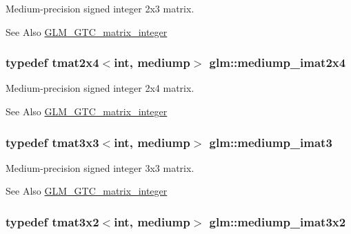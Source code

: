 Medium-\/precision signed integer 2x3 matrix. \begin{DoxySeeAlso}{See Also}
\hyperlink{group__gtc__matrix__integer}{G\-L\-M\-\_\-\-G\-T\-C\-\_\-matrix\-\_\-integer} 
\end{DoxySeeAlso}
\hypertarget{group__gtc__matrix__integer_ga944a139f15de6bc12e9c7bf615ffc4f5}{
\subsubsection[{mediump\-\_\-imat2x4}]{\setlength{\rightskip}{0pt plus 5cm}typedef tmat2x4$<$int, mediump$>$ {\bf glm\-::mediump\-\_\-imat2x4}}}\label{group__gtc__matrix__integer_ga944a139f15de6bc12e9c7bf615ffc4f5}
Medium-\/precision signed integer 2x4 matrix. \begin{DoxySeeAlso}{See Also}
\hyperlink{group__gtc__matrix__integer}{G\-L\-M\-\_\-\-G\-T\-C\-\_\-matrix\-\_\-integer} 
\end{DoxySeeAlso}
\hypertarget{group__gtc__matrix__integer_gab033bd6a2bfebb1aa35d458c6f077ccb}{
\subsubsection[{mediump\-\_\-imat3}]{\setlength{\rightskip}{0pt plus 5cm}typedef tmat3x3$<$int, mediump$>$ {\bf glm\-::mediump\-\_\-imat3}}}\label{group__gtc__matrix__integer_gab033bd6a2bfebb1aa35d458c6f077ccb}
Medium-\/precision signed integer 3x3 matrix. \begin{DoxySeeAlso}{See Also}
\hyperlink{group__gtc__matrix__integer}{G\-L\-M\-\_\-\-G\-T\-C\-\_\-matrix\-\_\-integer} 
\end{DoxySeeAlso}
\hypertarget{group__gtc__matrix__integer_ga8f682b5b64e2072c0729409ee6bfe2af}{
\subsubsection[{mediump\-\_\-imat3x2}]{\setlength{\rightskip}{0pt plus 5cm}typedef tmat3x2$<$int, mediump$>$ {\bf glm\-::mediump\-\_\-imat3x2}}}\label{group__gtc__matrix__integer_ga8f682b5b64e2072c0729409ee6bfe2af}

